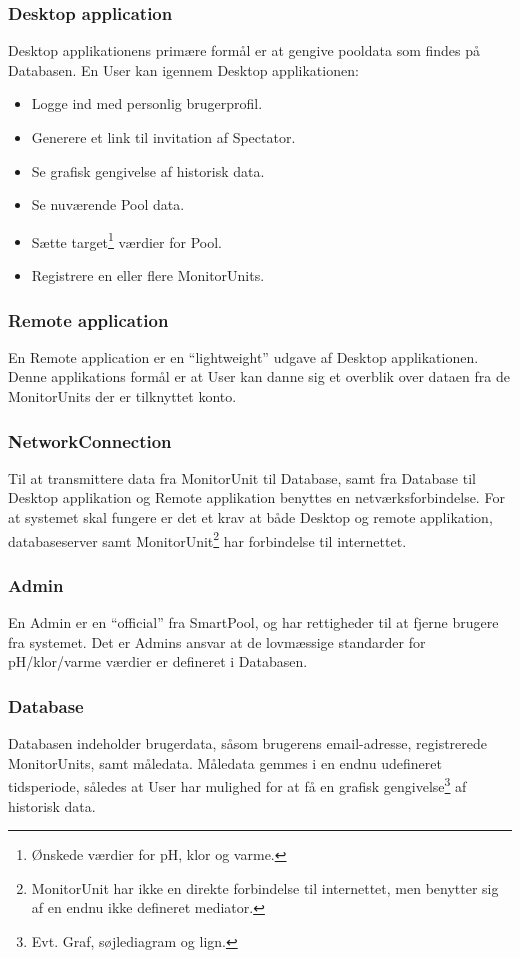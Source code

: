 \subsubsection{Desktop application}
Desktop applikationens primære formål er at gengive pooldata som findes på Databasen. En User kan igennem Desktop applikationen:

\begin{itemize}
	\item Logge ind med personlig brugerprofil.
	\item Generere et link til invitation af Spectator.
	\item Se grafisk gengivelse af historisk data.
	\item Se nuværende Pool data.
	\item Sætte target\footnote{  Ønskede værdier for pH, klor og varme.} værdier for Pool.
	\item Registrere en eller flere MonitorUnits.
\end{itemize}

\subsubsection{Remote application}
En Remote application er en “lightweight” udgave af Desktop applikationen. Denne applikations formål er at User kan danne sig et overblik over dataen fra de MonitorUnits der er tilknyttet konto.

\subsubsection{NetworkConnection}
Til at transmittere data fra MonitorUnit til Database, samt fra Database til Desktop applikation og Remote applikation benyttes en netværksforbindelse.  For at systemet skal fungere er det et krav at både Desktop og remote applikation, databaseserver samt MonitorUnit\footnote{  MonitorUnit har ikke en direkte forbindelse til internettet, men benytter sig af en endnu ikke defineret mediator.} har forbindelse til internettet.

\subsubsection{Admin}
En Admin er en “official” fra SmartPool\texttrademark, og har rettigheder til at fjerne brugere fra systemet. Det er Admins ansvar at de lovmæssige standarder for pH/klor/varme værdier er defineret i Databasen.

\subsubsection{Database}
Databasen indeholder brugerdata, såsom brugerens email-adresse, registrerede MonitorUnits, samt måledata. Måledata gemmes i en endnu udefineret tidsperiode, således at User har mulighed for at få en grafisk gengivelse\footnote{Evt. Graf, søjlediagram og lign.} af historisk data.

